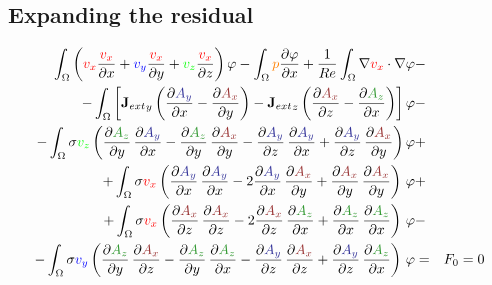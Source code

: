 \documentclass[smallextended]{svjour3}       %
\begin{document}
		\subsection{Expanding the residual}
		\begin{eqnarray}
			\int_{\Omega} \left(\textcolor{red}{v_x} \frac{\textcolor{red}{v_x}}{\partial x} + \textcolor{blue}{v_y} \frac{\textcolor{red}{v_x}}{\partial y} + \textcolor{green}{v_z} \frac{\textcolor{red}{v_x}}{\partial z}\right) \varphi
			- \int_{\Omega} \textcolor{orange}{p} \frac{\partial \varphi}{\partial x}
			+ \frac{1}{Re} \int_{\Omega} \nabla \textcolor{red}{v_x} \cdot \nabla \varphi
			\nonumber & -\\
			- \int_{\Omega} \left[{\mathbf{J}_{ext}}_y \left(\frac{\partial \textcolor{darkBlue}{A_y}}{\partial x} - \frac{\partial \textcolor{darkRed}{A_x}}{\partial y}\right) - {\mathbf{J}_{ext}}_z \left(\frac{\partial \textcolor{darkRed}{A_x}}{\partial z} - \frac{\partial \textcolor{darkGreen}{A_z}}{\partial x}\right)\right] \varphi			
			\nonumber & -\\
			- \int_{\Omega} \sigma \textcolor{green}{v_z} \left(\frac{\partial \textcolor{darkGreen}{A_z}}{\partial y}\,\frac{\partial \textcolor{darkBlue}{A_y}}{\partial x} - \frac{\partial \textcolor{darkGreen}{A_z}}{\partial y}\,\frac{\partial \textcolor{darkRed}{A_x}}{\partial y} - \frac{\partial \textcolor{darkBlue}{A_y}}{\partial z}\,\frac{\partial \textcolor{darkBlue}{A_y}}{\partial x} + \frac{\partial \textcolor{darkBlue}{A_y}}{\partial z}\,\frac{\partial \textcolor{darkRed}{A_x}}{\partial y} \right) \varphi& +\nonumber \\			
			+ \int_{\Omega} \sigma \textcolor{red}{v_x} \left(\frac{\partial \textcolor{darkBlue}{A_y}}{\partial x}\,\frac{\partial \textcolor{darkBlue}{A_y}}{\partial x} - 2 \frac{\partial \textcolor{darkBlue}{A_y}}{\partial x}\,\frac{\partial \textcolor{darkRed}{A_x}}{\partial y} + \frac{\partial \textcolor{darkRed}{A_x}}{\partial y}\,\frac{\partial \textcolor{darkRed}{A_x}}{\partial y} \right)\, \varphi& +\nonumber \\			
			+ \int_{\Omega} \sigma \textcolor{red}{v_x} \left(\frac{\partial \textcolor{darkRed}{A_x}}{\partial z}\,\frac{\partial \textcolor{darkRed}{A_x}}{\partial z} - 2 \frac{\partial \textcolor{darkRed}{A_x}}{\partial z}\,\frac{\partial \textcolor{darkGreen}{A_z}}{\partial x} + \frac{\partial \textcolor{darkGreen}{A_z}}{\partial x}\,\frac{\partial \textcolor{darkGreen}{A_z}}{\partial x} \right)\, \varphi& -\nonumber \\			
			- \int_{\Omega} \sigma \textcolor{blue}{v_y} \left(\frac{\partial \textcolor{darkGreen}{A_z}}{\partial y}\,\frac{\partial \textcolor{darkRed}{A_x}}{\partial z} - \frac{\partial \textcolor{darkGreen}{A_z}}{\partial y}\,\frac{\partial \textcolor{darkGreen}{A_z}}{\partial x} - \frac{\partial \textcolor{darkBlue}{A_y}}{\partial z}\,\frac{\partial \textcolor{darkRed}{A_x}}{\partial z}  + \frac{\partial \textcolor{darkBlue}{A_y}}{\partial z}\,\frac{\partial \textcolor{darkGreen}{A_z}}{\partial x} \right)\, \varphi& = & F_0 = 0 \\			

\end{eqnarray}
\end{document}

